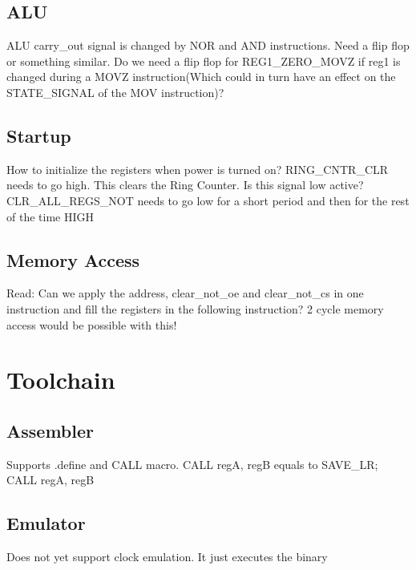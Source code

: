 \documentclass[a4paper, 12pt]{article}
\begin{document}
	\subsection{ALU}
	ALU carry\_out signal is changed by NOR and AND instructions. Need a flip flop or something similar.
	Do we need a flip flop for REG1\_ZERO\_MOVZ if reg1 is changed during a MOVZ instruction(Which could in turn have an effect on the STATE\_SIGNAL of the MOV instruction)?
	\subsection{Startup}
	How to initialize the registers when power is turned on?
	RING\_CNTR\_CLR needs to go high. This clears the Ring Counter. Is this signal low active?
	CLR\_ALL\_REGS\_NOT needs to go low for a short period and then for the rest of the time HIGH
	\subsection{Memory Access}
	Read: Can we apply the address, clear\_not\_oe and clear\_not\_cs in one instruction and fill the registers in the following instruction? 2 cycle memory access would be possible with this!
	\section{Toolchain}
	\subsection{Assembler}
	Supports .define  and CALL macro. CALL regA, regB equals to SAVE\_LR; CALL regA, regB
	\subsection{Emulator}
	Does not yet support clock emulation. It just executes the binary
\end{document}
